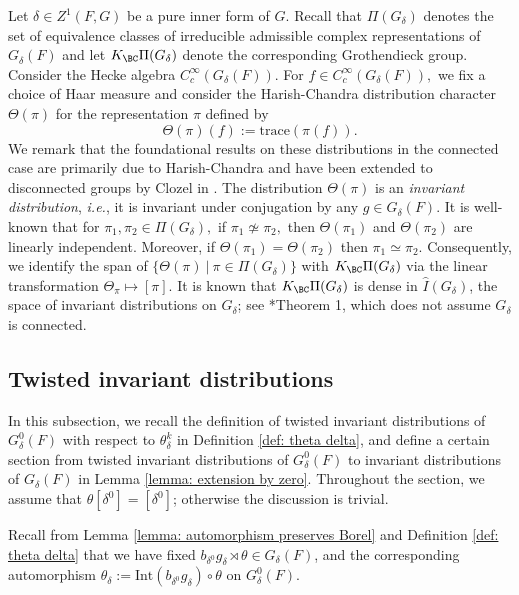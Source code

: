 \documentclass[11pt,letterpaper]{amsart}
\numberwithin{equation}{section}
\begin{document}
Let $\delta\in Z^1(F,G)$ be a pure inner form of $G$. 
Recall that $\Pi(G_\delta)$ denotes the set of equivalence classes of irreducible admissible complex representations of $G_\delta(F)$ and let $K_{\BC}\Pi(G_\delta)$ denote the corresponding Grothendieck group. 
Consider the Hecke algebra $C_c^\infty(G_\delta(F))$. 
For $f\in C_c^\infty(G_\delta(F)),$ we fix a choice of Haar measure and consider the Harish-Chandra distribution character $\Theta(\pi)$ for the representation $\pi$ defined by 
\[
\Theta(\pi)(f):=\mathrm{trace}(\pi(f)).
\]
We remark that the foundational results on these distributions in the connected case are primarily due to Harish-Chandra and have been extended to disconnected groups by Clozel in \cite{Clo87}.
The distribution $\Theta(\pi)$ is an {\it invariant distribution}, {\it i.e.}, it is invariant under conjugation by any $g\in G_\delta(F).$
It is well-known that for $\pi_1,\pi_2\in\Pi(G_\delta),$ if $\pi_1\not\simeq\pi_2,$ then $\Theta({\pi_1})$ and $\Theta({\pi_2})$ are linearly independent. 
Moreover, if $\Theta(\pi_1)=\Theta(\pi_2)$ then $\pi_1\simeq\pi_2$. 
Consequently, we identify the span of 
$
\{
\Theta(\pi) \ | \ \pi\in\Pi(G_\delta)
\}
$ 
with $K_{\BC}\Pi(G_\delta)$ via the linear transformation $\Theta_{\pi}\mapsto[\pi]$. It is known that $K_{\BC}\Pi(G_{\delta})$ is dense in $\widehat{I}(G_{\delta})$, the space of invariant distributions on $G_{\delta}$; see \cite{Kaz86a}*{Theorem 1}, which does not assume $G_\delta$ is connected. 




\subsection{Twisted invariant distributions}\label{sec twisted invariant distribution}


In this subsection, we recall the definition of twisted invariant distributions of $G_{\delta}^0(F)$ with respect to $\theta_{\delta}^k$ in Definition \ref{def: theta delta}, and define a certain section from twisted invariant distributions of $G_{\delta}^0(F)$ to invariant distributions of $G_{\delta}(F)$ in Lemma \ref{lemma: extension by zero}. Throughout the section, we assume that $\theta[\delta^0]=[\delta^0]$; otherwise the discussion is trivial.

Recall from Lemma \ref{lemma: automorphism preserves Borel} and Definition \ref{def: theta delta} that we have fixed $b_{\delta^0}g_{\delta}\rtimes \theta \in G_{\delta}(F)$, and the corresponding automorphism $\theta_{\delta}:= \textrm{Int}(b_{\delta^0}g_{\delta}) \circ \theta$ on $G^0_\delta(F)$.
\end{document}
